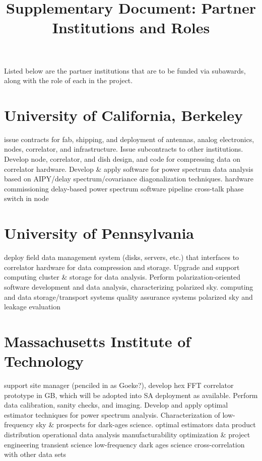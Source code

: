 \documentclass[preprint]{aastex}
\begin{document}
\title{Supplementary Document:  Partner Institutions and Roles}

\noindent
Listed below are the partner institutions that are to be funded
via subawards, along with the role of each in the project.
\vspace{0.25in}

\section*{University of California, Berkeley}

issue contracts for fab, shipping, and deployment of antennas, analog
electronics, nodes, correlator, and infrastructure.  Issue subcontracts to
other institutions.  Develop node, correlator, and dish design, and code for
compressing data on correlator hardware.  Develop \& apply software for power
spectrum data analysis based on AIPY/delay spectrum/covariance diagonalization
techniques.  hardware commissioning delay-based power spectrum software
pipeline cross-talk phase switch in node

\section*{University of Pennsylvania}

deploy field data management system (disks, servers, etc.) that interfaces to
correlator hardware for data compression and storage.  Upgrade and support
computing cluster \& storage for data analysis.  Perform polarization-oriented
software development and data analysis, characterizing polarized sky.
computing and data storage/transport systems quality assurance systems
polarized sky and leakage evaluation

\section*{Massachusetts Institute of Technology}

support site manager (penciled in as Goeke?), develop hex FFT correlator
prototype in GB, which will be adopted into SA deployment as available.
Perform data calibration, sanity checks, and imaging.  Develop and apply
optimal estimator techniques for power spectrum analysis.  Characterization of
low-frequency sky \& prospects for dark-ages science.  optimal estimators data
product distribution operational data analysis manufacturability optimization \&
project engineering transient science low-frequency dark ages science
cross-correlation with other data sets
\end{document}
